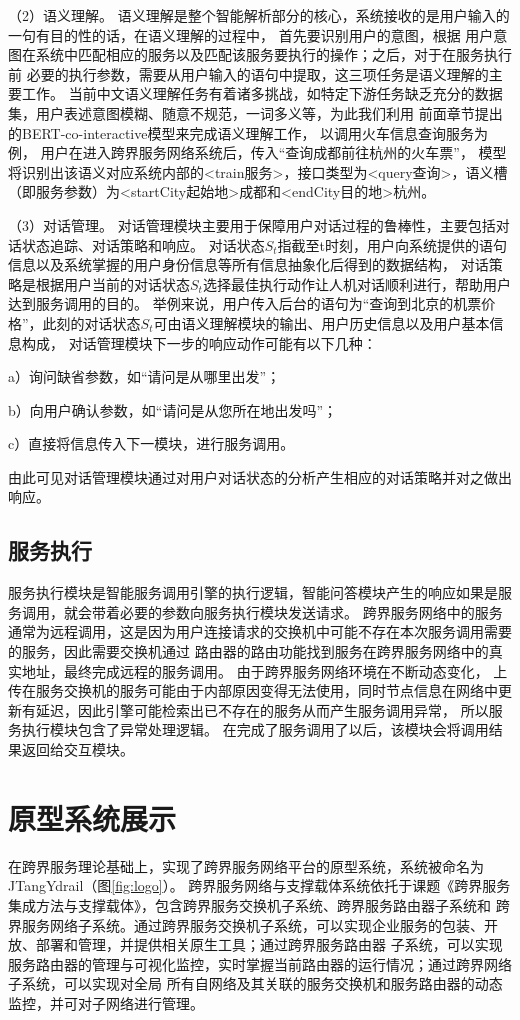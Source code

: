 （2）语义理解。 
语义理解是整个智能解析部分的核心，系统接收的是用户输入的一句有目的性的话，在语义理解的过程中，
首先要识别用户的意图，根据
用户意图在系统中匹配相应的服务以及匹配该服务要执行的操作；之后，对于在服务执行前
必要的执行参数，需要从用户输入的语句中提取，这三项任务是语义理解的主要工作。
当前中文语义理解任务有着诸多挑战，如特定下游任务缺乏充分的数据集，用户表述意图模糊、随意不规范，一词多义等，为此我们利用
前面章节提出的BERT-co-interactive模型来完成语义理解工作，
以调用火车信息查询服务为例，
用户在进入跨界服务网络系统后，传入“查询成都前往杭州的火车票”，
模型将识别出该语义对应系统内部的<train服务>，接口类型为<query查询>，语义槽（即服务参数）为<startCity起始地>成都和<endCity目的地>杭州。

（3）对话管理。
对话管理模块主要用于保障用户对话过程的鲁棒性，主要包括对话状态追踪、对话策略和响应。
对话状态$S_{t}$指截至t时刻，用户向系统提供的语句信息以及系统掌握的用户身份信息等所有信息抽象化后得到的数据结构，
对话策略是根据用户当前的对话状态$S_{t}$选择最佳执行动作让人机对话顺利进行，帮助用户达到服务调用的目的。
举例来说，用户传入后台的语句为“查询到北京的机票价格”，此刻的对话状态$S_{t}$可由语义理解模块的输出、用户历史信息以及用户基本信息构成，
对话管理模块下一步的响应动作可能有以下几种：

a）询问缺省参数，如“请问是从哪里出发”；

b）向用户确认参数，如“请问是从您所在地出发吗”；

c）直接将信息传入下一模块，进行服务调用。

由此可见对话管理模块通过对用户对话状态的分析产生相应的对话策略并对之做出响应。

\subsection{服务执行}
服务执行模块是智能服务调用引擎的执行逻辑，智能问答模块产生的响应如果是服务调用，就会带着必要的参数向服务执行模块发送请求。
跨界服务网络中的服务通常为远程调用，这是因为用户连接请求的交换机中可能不存在本次服务调用需要的服务，因此需要交换机通过
路由器的路由功能找到服务在跨界服务网络中的真实地址，最终完成远程的服务调用。
由于跨界服务网络环境在不断动态变化，
上传在服务交换机的服务可能由于内部原因变得无法使用，同时节点信息在网络中更新有延迟，因此引擎可能检索出已不存在的服务从而产生服务调用异常，
所以服务执行模块包含了异常处理逻辑。
在完成了服务调用了以后，该模块会将调用结果返回给交互模块。


\section{原型系统展示}
在跨界服务理论基础上，实现了跨界服务网络平台的原型系统，系统被命名为JTangYdrail（图\ref{fig:logo}）。
跨界服务网络与支撑载体系统依托于课题《跨界服务集成方法与支撑载体》，包含跨界服务交换机子系统、跨界服务路由器子系统和
跨界服务网络子系统。通过跨界服务交换机子系统，可以实现企业服务的包装、开放、部署和管理，并提供相关原生工具；通过跨界服务路由器
子系统，可以实现服务路由器的管理与可视化监控，实时掌握当前路由器的运行情况；通过跨界网络子系统，可以实现对全局
所有自网络及其关联的服务交换机和服务路由器的动态监控，并可对子网络进行管理。

